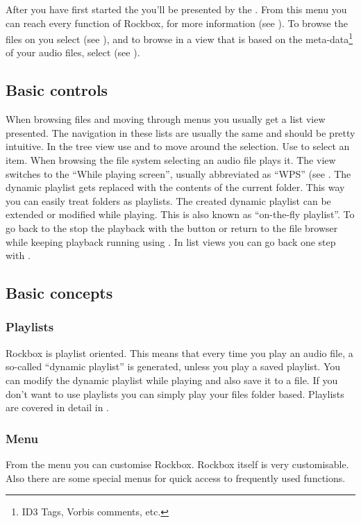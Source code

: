 After you have first started the \dap{} you'll be presented by the
. From this menu you can reach every function of Rockbox,
for more information (see ). To browse the files
on you \dap{} select  (see ), and to
browse in a view that is based on the meta-data\footnote{ID3 Tags, Vorbis
comments, etc.} of your audio files, select  (see
).

\subsection{Basic controls}
When browsing files and moving through menus you usually get a list view
presented. The navigation in these lists are usually the same and should be
pretty intuitive.
In the tree view use \ActionStdNext{} and \ActionStdPrev{} to move around
the selection. Use \ActionStdOk{} to select an item. When browsing the file
system selecting an audio file plays it. The view switches to the ``While
playing screen'', usually abbreviated as ``WPS'' (see . The
dynamic playlist gets replaced with the contents of the current folder. This
way you can easily treat folders as playlists. The created dynamic playlist can
be extended or modified while playing. This is also known as
``on-the-fly playlist''.
To go back to the  stop the playback with the
\ActionWpsStop{} button or return to the file browser while keeping playback
running using \ActionWpsBrowse{}.
In list views you can go back one step with \ActionTreeParentDirectory.

\subsection{Basic concepts}
\subsubsection{Playlists}
Rockbox is playlist oriented. This means that every time you play an audio file,
a so-called ``dynamic playlist'' is generated, unless you play a saved
playlist. You can modify the dynamic playlist while playing and also save
it to a file. If you don't want to use playlists you can simply play your
files folder based.
Playlists are covered in detail in .

\subsubsection{Menu}
From the menu you can customise Rockbox. Rockbox itself is very customisable.
Also there are some special menus for quick access to frequently used
functions.


